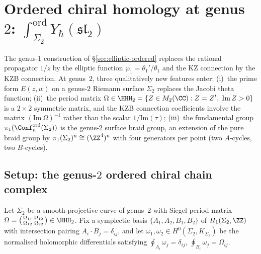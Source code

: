
\section{Ordered chiral homology at genus~$2$:
$\int_{\Sigma_2}^{\mathrm{ord}} Y_\hbar(\mathfrak{sl}_2)$}
\label{sec:genus2-ordered}

The genus-$1$ construction of \S\ref{sec:elliptic-ordered}
replaces the rational propagator $1/z$ by the elliptic
function $\wp_1 = \theta_1'/\theta_1$ and the KZ connection
by the KZB connection. At genus~$2$, three qualitatively
new features enter: (i)~the prime form $E(z,w)$ on a
genus-$2$ Riemann surface $\Sigma_2$ replaces the Jacobi
theta function; (ii)~the period matrix
$\Omega \in \HHH_2 = \{Z \in M_2(\CC) : Z = Z^t,\;
\mathrm{Im}\,Z > 0\}$ is a $2 \times 2$ symmetric matrix,
and the KZB connection coefficients involve the matrix
$(\mathrm{Im}\,\Omega)^{-1}$ rather than the scalar
$1/\mathrm{Im}(\tau)$; (iii)~the fundamental group
$\pi_1(\Conf_n^{\mathrm{ord}}(\Sigma_2))$ is the genus-$2$
surface braid group, an extension of the pure braid group
by $\pi_1(\Sigma_2)^n \cong (\ZZ^4)^n$ with four generators
per point (two $A$-cycles, two $B$-cycles).

\subsection{Setup: the genus-$2$ ordered chiral chain
complex}
\label{subsec:genus2-setup}

Let $\Sigma_2$ be a smooth projective curve of genus~$2$
with Siegel period matrix
$\Omega = \bigl(\begin{smallmatrix}
\Omega_{11} & \Omega_{12} \\
\Omega_{12} & \Omega_{22}
\end{smallmatrix}\bigr)
\in \HHH_2$.
Fix a symplectic basis
$\{A_1, A_2, B_1, B_2\}$ of $H_1(\Sigma_2, \ZZ)$
with intersection pairing
$A_i \cdot B_j = \delta_{ij}$, and let
$\omega_1, \omega_2 \in H^0(\Sigma_2, K_{\Sigma_2})$
be the normalised holomorphic differentials satisfying
$\oint_{A_i} \omega_j = \delta_{ij}$,
$\oint_{B_i} \omega_j = \Omega_{ij}$.

